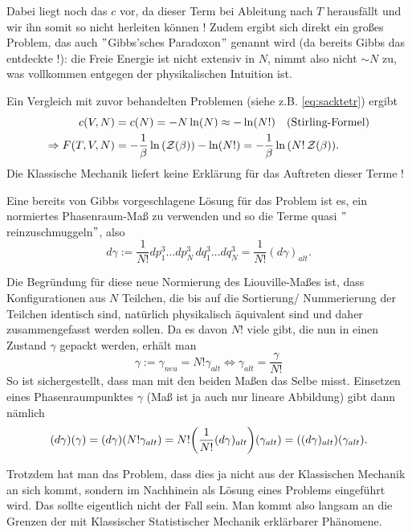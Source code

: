 Dabei liegt noch das $c$ vor, da dieser Term bei Ableitung nach $T$ herausfällt und wir ihn somit so nicht herleiten können ! Zudem ergibt sich direkt ein großes Problem, das auch $"$Gibbs'sches Paradoxon$"$ genannt wird (da bereits Gibbs das entdeckte !): die Freie Energie ist nicht extensiv in $N$, nimmt also nicht $\sim N$ zu, was vollkommen entgegen der physikalischen Intuition ist.

Ein Vergleich mit zuvor behandelten Problemen (siehe z.B. \eqref{eq:sacktetr}) ergibt
\begin{align}\label{key}
c(V, N) &= c(N) = -N \ln(N) \approx -\ln(N!) \quad (\text{Stirling-Formel})
\\
\Rightarrow F(T, V, N) &= -\frac{1}{\beta} \ln\qty(\mathcal{Z}(\beta)) -\ln(N!)  = -\frac{1}{\beta} \ln\qty(N! \, \mathcal{Z}(\beta)) .
\end{align}
Die Klassische Mechanik liefert keine Erklärung für das Auftreten dieser Terme !


Eine bereits von Gibbs vorgeschlagene Lösung für das Problem ist es, ein normiertes Phasenraum-Maß zu verwenden und so die Terme quasi $"$reinzuschmuggeln$"$, also
\begin{equation}\label{key}
d\gamma := \frac{1}{N!} dp^3_1 \dots dp^3_N \, dq^3_1 \dots dq^3_N = \frac{1}{N!} (d\gamma)_{alt} .
\end{equation}


Die Begründung für diese neue Normierung des Liouville-Maßes ist, dass Konfigurationen aus $N$ Teilchen, die bis auf die Sortierung/ Nummerierung der Teilchen identisch sind, natürlich physikalisch äquivalent sind und daher zusammengefasst werden sollen. Da es davon $N!$ viele gibt, die nun in einen Zustand $\gamma$ gepackt werden, erhält man
\begin{equation}\label{key}
\gamma := \gamma_{neu} = N! \gamma_{alt} \Leftrightarrow \gamma_{alt} = \frac{\gamma}{N!}
\end{equation}
So ist sichergestellt, dass man mit den beiden Maßen das Selbe misst. Einsetzen eines Phasenraumpunktes $\gamma$ (Maß ist ja auch nur lineare Abbildung) gibt dann nämlich
\begin{equation}\label{key}
(d\gamma)(\gamma) = (d\gamma)\qty(N! \gamma_{alt}) = N! \qty(\frac{1}{N!} (d\gamma)_{alt})\qty(\gamma_{alt}) = \qty((d\gamma)_{alt})\qty(\gamma_{alt}) .
\end{equation}

Trotzdem hat man das Problem, dass dies ja nicht aus der Klassischen Mechanik an sich kommt, sondern im Nachhinein als Lösung eines Problems eingeführt wird. Das sollte eigentlich nicht der Fall sein. Man kommt also langsam an die Grenzen der mit Klassischer Statistischer Mechanik erklärbarer Phänomene.\\

